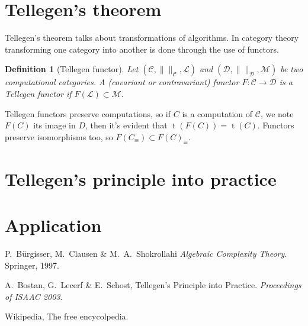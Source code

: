 \documentclass{article}
\newcommand{\cat}[1]{\mathscr{#1}}
\newcommand{\C}{\cat{C}}
\newcommand{\D}{\cat{D}}
\renewcommand{\L}{\cat{L}}
\newcommand{\size}[1]{\lVert#1\rVert}
\newcommand{\ra}{\rightarrow}
\DeclareMathOperator{\Time}{t}
\newtheorem{definition}{Definition}
\begin{document}
  \section{Tellegen's theorem}

  Tellegen's theorem talks about transformations of algorithms. In
  category theory transforming one category into another is done
  through the use of functors.

  \begin{definition}[Tellegen functor]
    Let $(\C,\size{}_{\C},\L)$ and $(\D,\size{}_{\D},\cat{M})$ be two
    computational categories. A (covariant or contravariant) functor
    $F:\C\ra\D$ is a \emph{Tellegen functor} if $F(\L)\subset\cat{M}$.
  \end{definition}

  Tellegen functors preserve computations, so if $C$ is a computation
  of $\C$, we note $F(C)$ its image in $D$, then it's evident that
  $\Time(F(C)) = \Time(C)$. Functors preserve isomorphisms too, so
  $F(C_\equiv) \subset F(C)_\equiv$.


  
  \section{Tellegen's principle into practice}
  \label{sec:practice}
  
  \section{Application}


  
  \begin{thebibliography}{1}
    
  P.~Bürgisser, M.~Clausen \& M.~A.~Shokrollahi
    \emph{Algebraic Complexity Theory}.
    Springer, 1997.
    
  A.~Bostan, G.~Lecerf \& E.~Schost,
    Tellegen's Principle into Practice.
    \emph{Proceedings of ISAAC 2003}.

  Wikipedia, The free encycolpedia.
  
  \end{thebibliography}
\end{document}
